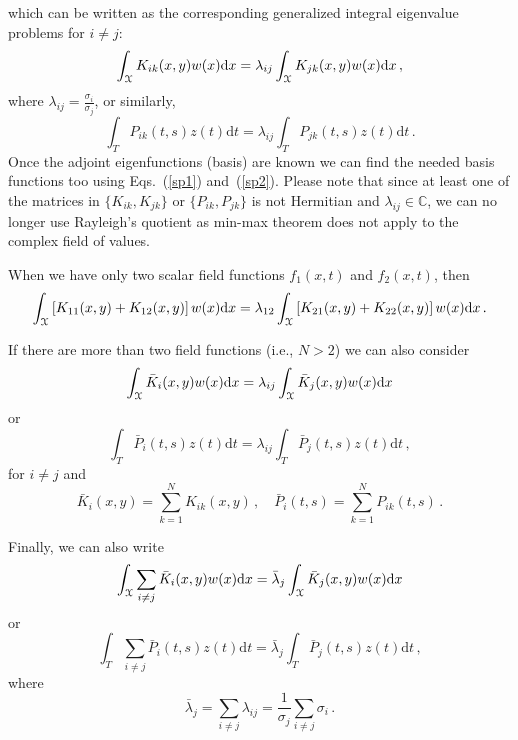 \documentclass[10pt]{article}
\newcommand{\eqstwo}[2]{Eqs.\ (\ref{#1}) and~(\ref{#2})}
\begin{document}
which can be written as the corresponding generalized integral eigenvalue problems for $i\ne j$:
\begin{equation}
	\int_{\cal X} K_{ik}(x,y) w(x) \mathrm{d} x = \lambda_{ij} \int_{\cal X} K_{jk}(x,y) w(x) \mathrm{d} x\,,
 \end{equation}
where $\lambda_{ij} = \frac{\sigma_{i}}{\sigma_{j}}$, or similarly,
\begin{equation}
		\int_T P_{ik}(t,s) z(t) \mathrm{d} t=\lambda_{ij} \int_T P_{jk}(t,s) z(t) \mathrm{d} t\,.
\end{equation}
Once the adjoint eigenfunctions (basis) are known we can find the needed basis functions too  using \eqstwo{sp1}{sp2}.
Please note that since at least one of the matrices in $\{K_{ik},K_{jk}\}$ or $\{P_{ik},P_{jk}\}$ is not Hermitian and $\lambda_{ij}\in \mathbb{C}$, we can no longer use Rayleigh's quotient as min-max theorem does not apply to the complex field of values.

When we have only two scalar field functions $f_1(x,t)$ and $f_2(x,t)$, then
\begin{equation}
	\int_{\cal X} \left[K_{11}(x,y)+K_{12}(x,y)\right] w(x) \mathrm{d} x = \lambda_{12} \int_{\cal X} \left[K_{21}(x,y)+K_{22}(x,y)\right] w(x) \mathrm{d} x\,.
\end{equation}

If there are more than two field functions (i.e., $N>2$) we can also consider 
\begin{equation}
	\int_{\cal X}  \bar K_i(x, y) w(x) \mathrm{d} x = \lambda_{ij}  \int_{\cal X}  \bar K_j(x, y) w(x) \mathrm{d} x
 \end{equation}
or
\begin{equation}
		\int_T  \bar P_i(t, s) z(t) \mathrm{d} t= \lambda_{ij} \int_T \bar P_j (t, s)z(t) \mathrm{d} t\,,
\end{equation}
for $i\ne j$ and
\begin{equation}
	\bar K_i(x, y) = \sum_{k=1}^N K_{ik}(x, y)\,, \quad
	\bar P_i(t, s) = \sum_{k=1}^N P_{ik}(t, s)\,.
\end{equation}

Finally, we can also write
\begin{equation}
	\int_{\cal X}  \sum_{i\ne j} \bar K_i(x, y) w(x) \mathrm{d} x = \bar \lambda_j  \int_{\cal X}  \bar K_j(x, y) w(x) \mathrm{d} x
 \end{equation}
or
\begin{equation}
		\int_T  \sum_{i\ne j} \bar P_i(t, s) z(t) \mathrm{d} t= \bar \lambda_j \int_T \bar P_j (t, s)z(t) \mathrm{d} t\,,
\end{equation}
where
\begin{equation}
	\bar \lambda_j = \sum_{i\ne j} \lambda_{ij} = \frac{1}{\sigma_j}\sum_{i\ne j} \sigma_i\,.
\end{equation}
\end{document}
